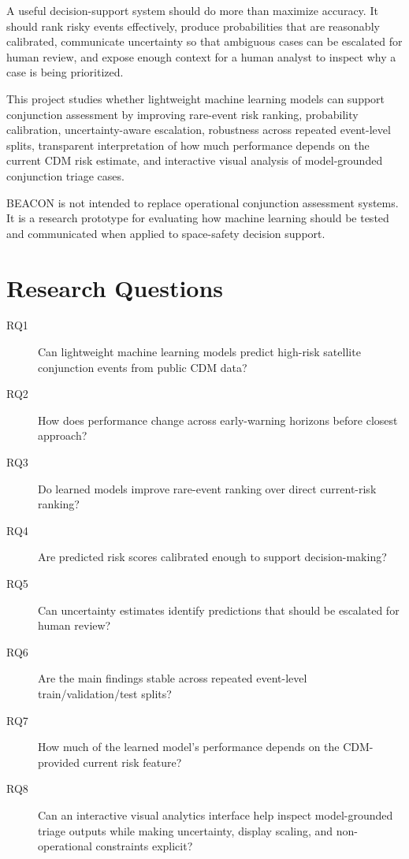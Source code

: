 \documentclass[11pt]{article}
\begin{document}
A useful decision-support system should do more than maximize accuracy. It should rank risky events effectively, produce probabilities that are reasonably calibrated, communicate uncertainty so that ambiguous cases can be escalated for human review, and expose enough context for a human analyst to inspect why a case is being prioritized.

This project studies whether lightweight machine learning models can support conjunction assessment by improving rare-event risk ranking, probability calibration, uncertainty-aware escalation, robustness across repeated event-level splits, transparent interpretation of how much performance depends on the current CDM risk estimate, and interactive visual analysis of model-grounded conjunction triage cases.

BEACON is not intended to replace operational conjunction assessment systems. It is a research prototype for evaluating how machine learning should be tested and communicated when applied to space-safety decision support.

\section{Research Questions}

\begin{description}
    \item[RQ1] Can lightweight machine learning models predict high-risk satellite conjunction events from public CDM data?
    \item[RQ2] How does performance change across early-warning horizons before closest approach?
    \item[RQ3] Do learned models improve rare-event ranking over direct current-risk ranking?
    \item[RQ4] Are predicted risk scores calibrated enough to support decision-making?
    \item[RQ5] Can uncertainty estimates identify predictions that should be escalated for human review?
    \item[RQ6] Are the main findings stable across repeated event-level train/validation/test splits?
    \item[RQ7] How much of the learned model's performance depends on the CDM-provided current risk feature?
    \item[RQ8] Can an interactive visual analytics interface help inspect model-grounded triage outputs while making uncertainty, display scaling, and non-operational constraints explicit?
\end{description}
\end{document}

